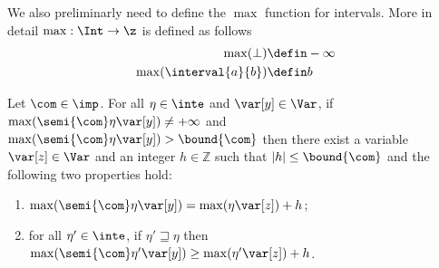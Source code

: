 We also preliminarly need to define the \(\max\) function for
intervals. More in detail \(\max : \Int \to \z\) is defined as follows
\begin{align*}
  \max(\bot) & \defin - \infty \\
  \max(\interval{a}{b}) & \defin b
\end{align*}

\begin{lemma}\label{le:inc}
  Let \(\com\in \imp\).
  For all \(\eta \in \inte\) and \(\var[y] \in \Var\), if
  \(\max(\semi{\com} \eta \var[y]) \neq +\infty\) and
  \(\max(\semi{\com}\eta \var[y]) > \bound{\com}\) then there exist a
  variable \(\var[z] \in \Var\) and an integer \(h \in \mathbb{Z}\)
  such that \(|h| \leq \bound{\com}\) and the following two properties
  hold:
  \begin{enumerate}[label=(\roman*)]
  \item\label{point1} \(\max(\semi{\com}\eta \var[y]) = \max(\eta \var[z]) + h\); 
  \item\label{point2} for all \(\eta' \in \inte\), if \(\eta' \sqsupseteq \eta\)
    then
    \(\max(\semi{\com}\eta' \var[y]) \geq \max(\eta' \var[z]) + h\).
  \end{enumerate}
\end{lemma}

